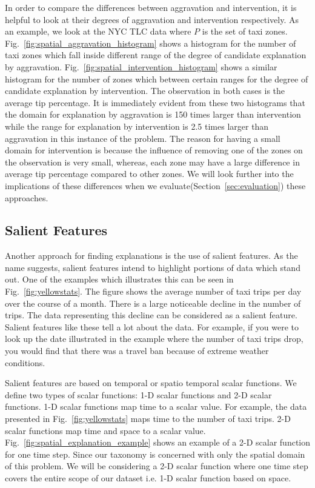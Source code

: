 In order to compare the differences between aggravation and intervention, it is helpful to look at their degrees of aggravation and intervention respectively. As an example, we look at the NYC TLC data where $P$ is the set of taxi zones. Fig.~\ref{fig:spatial_aggravation_histogram} shows a histogram for the number of taxi zones which fall inside different range of the degree of candidate explanation by aggravation. Fig.~\ref{fig:spatial_intervention_histogram} shows a similar histogram for the number of zones which between certain ranges for the degree of candidate explanation by intervention. The observation in both cases is the average tip percentage. It is immediately evident from these two histograms that the domain for explanation by aggravation is 150 times larger than intervention while the range for explanation by intervention is 2.5 times larger than aggravation in this instance of the problem. The reason for having a small domain for intervention is because the influence of removing one of the zones on the observation is very small, whereas, each zone may have a large difference in average tip percentage compared to other zones. We will look further into the implications of these differences when we evaluate(Section~\ref{sec:evaluation}) these approaches.

\subsection{Salient Features}
\label{sec:salient_features}

Another approach for finding explanations is the use of salient features. As the name suggests, salient features intend to highlight portions of data which stand out. One of the examples which illustrates this can be seen in Fig.~\ref{fig:yellowstats}. The figure shows the average number of taxi trips per day over the course of a month. There is a large noticeable decline in the number of trips. The data representing this decline can be considered as a salient feature. Salient features like these tell a lot about the data. For example, if you were to look up the date illustrated in the example where the number of taxi trips drop, you would find that there was a travel ban because of extreme weather conditions. 

Salient features are based on temporal or spatio temporal scalar functions. We define two types of scalar functions: 1-D scalar functions and 2-D scalar functions. 1-D scalar functions map time to a scalar value. For example, the data presented in Fig.~\ref{fig:yellowstats} maps time to the number of taxi trips. 2-D scalar functions map time and space to a scalar value.  Fig.~\ref{fig:spatial_explanation_example} shows an example of a 2-D scalar function for one time step. Since our taxonomy is concerned with only the spatial domain of this problem. We will be considering a 2-D scalar function where one time step covers the entire scope of our dataset i.e. 1-D scalar function based on space. 


